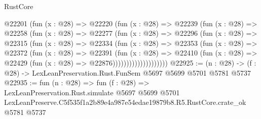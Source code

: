 \begin{lexlean}{RustCore}
\begin{coremodule}
                @22201
                  (fun (x : @28) =>
                  @22220
                    (fun (x : @28) =>
                    @22239
                      (fun (x : @28) =>
                      @22258
                        (fun (x : @28) =>
                        @22277
                          (fun (x : @28) =>
                          @22296
                            (fun (x : @28) =>
                            @22315
                              (fun (x : @28) =>
                              @22334
                                (fun (x : @28) =>
                                @22353
                                  (fun (x : @28) =>
                                  @22372
                                    (fun (x : @28) =>
                                    @22391
                                      (fun (x : @28) =>
                                      @22410
                                        (fun (x : @28) =>
                                        @22429 (fun (x : @28) => @22876))))))))))))))))))))
@22925 := (n : @28) -> (f : @28) -> LexLeanPreservation.Rust.FunSem @5697 @5699 @5701 @5781 @5737
@22935 := fun (n : @28) =>
  fun (f : @28) =>
  LexLeanPreservation.Rust.simulate
    @5697
    @5699
    @5701
    LexLeanPreserve.C5f535f1a2b89e4a987e54edae19879b8.R5.RustCore.crate_ok
    @5781
    @5737
\end{coremodule}
\end{lexlean}
